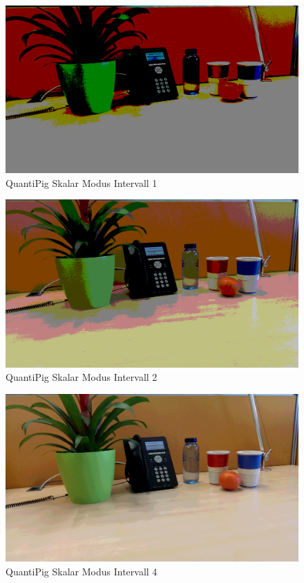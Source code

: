 \begin{landscape}
\begin{figure}[h]
	\centering
		\includegraphics[width=1.4\textwidth]{img/Fotos/QuantiPig_Skalar_1.png}
	\caption[QuantiPig Skalar Modus Intervall 1]{QuantiPig Skalar Modus Intervall 1}
	\label{fig:pig_skal1}
\end{figure}

\begin{figure}[h]
	\centering
		\includegraphics[width=1.4\textwidth]{img/Fotos/QuantiPig_Skalar_2.png}
	\caption[QuantiPig Skalar Modus Intervall 2]{QuantiPig Skalar Modus Intervall 2}
	\label{fig:pig_skal2}
\end{figure}

\begin{figure}[h]
	\centering
		\includegraphics[width=1.4\textwidth]{img/Fotos/QuantiPig_Skalar_4.png}
	\caption[QuantiPig Skalar Modus Intervall 4]{QuantiPig Skalar Modus Intervall 4}
	\label{fig:pig_skal4}
\end{figure}


\end{landscape}
